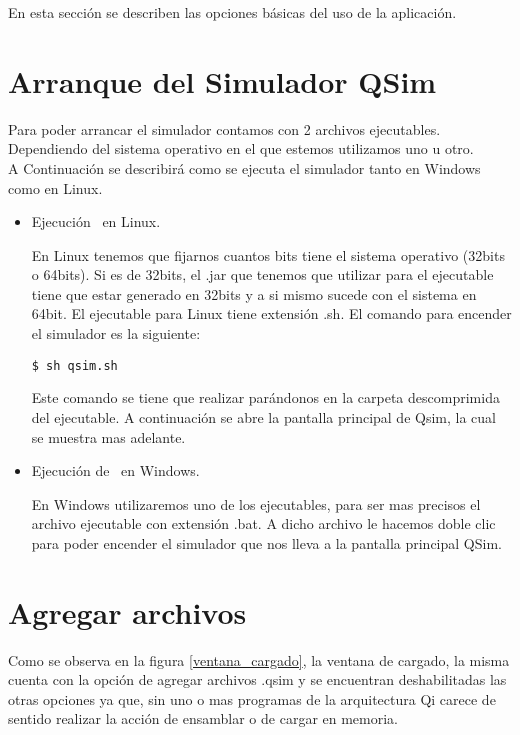
En esta sección se describen las opciones básicas del uso de la aplicación.

\section{Arranque del Simulador QSim}
Para poder arrancar el simulador contamos con 2 archivos ejecutables. 
Dependiendo del sistema operativo en el que estemos utilizamos uno u otro.\\

A Continuación se describirá como se ejecuta el simulador \qsim tanto en Windows como en Linux.
\begin{itemize}

\item Ejecución \qsim\ en Linux.

En Linux tenemos que fijarnos cuantos bits tiene el sistema operativo (32bits o 64bits). Si es de 32bits, el .jar que tenemos que utilizar para el ejecutable tiene que estar generado en 32bits y a si mismo sucede con el sistema en 64bit. El ejecutable para Linux tiene extensión .sh. El comando para encender el simulador es la siguiente:

\begin{verbatim}
$ sh qsim.sh
\end{verbatim}

Este comando se tiene que realizar parándonos en la carpeta descomprimida del ejecutable. 
A continuación se abre la pantalla principal de Qsim, la cual se muestra mas adelante.

\item Ejecución de \qsim\ en Windows.

En Windows utilizaremos uno de los ejecutables, para ser mas precisos el archivo ejecutable con extensión .bat.
A dicho archivo le hacemos doble clic para poder encender el simulador que nos lleva a la pantalla principal QSim.

 
\end{itemize}

\section{Agregar archivos}
Como se observa en la figura \ref{ventana_cargado}, la ventana de cargado, la misma cuenta con la opción de agregar archivos .qsim y se encuentran deshabilitadas las otras opciones ya que, sin uno o mas programas de la arquitectura Qi carece de sentido realizar la acción de ensamblar o de cargar en memoria.

